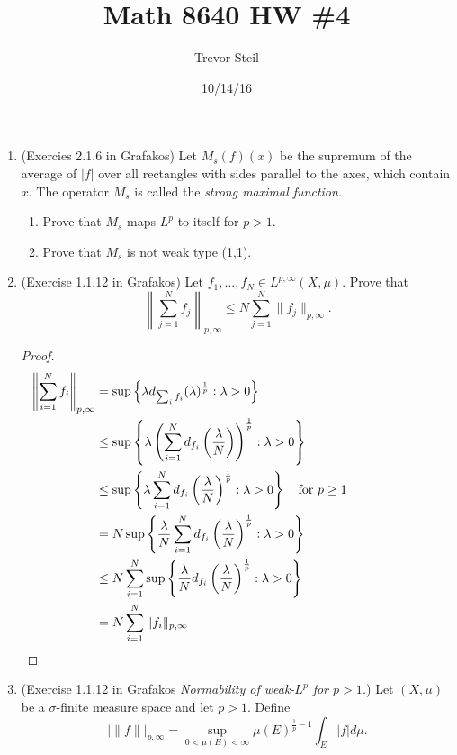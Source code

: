\documentclass[a4paper]{article}
\title{Math 8640 HW \#4}
\date{10/14/16}
\author{Trevor Steil}
\begin{document}
\maketitle

\begin{enumerate}
  \item (Exercies 2.1.6 in Grafakos) Let $M_s(f)(x)$ be the supremum of the average of $|f|$ over all rectangles with sides parallel to the axes,
    which contain $x$. The operator $M_s$ is called the \textit{strong maximal function}.

    \begin{enumerate}
      \item Prove that $M_s$ maps $L^p$ to itself for $p>1$.
      \item Prove that $M_s$ is not weak type (1,1).
    \end{enumerate}

  \item (Exercise 1.1.12 in Grafakos) Let $f_1, \dots, f_N \in L^{p,\infty}(X,\mu)$. Prove that
    \[ \left\| \sum_{j=1}^N f_j \right\|_{p,\infty} \leq N \sum_{j=1}^N \| f_j \|_{p,\infty} .\]

    \begin{proof}

      \begin{align*}
        \left\| \sum_{i=1}^N f_i \right\|_{p,\infty} &= \sup \left\{ \lambda d_{\sum_i f_i}(\lambda)^{\frac{1}{p}} : \lambda>0 \right\} \\
        &\leq \sup \left\{ \lambda \left( \sum_{i=1}^N d_{f_i} \left( \frac{\lambda}{N} \right) \right)^{\frac{1}{p}} : \lambda>0 \right\} \\
        &\leq \sup \left\{ \lambda \sum_{i=1}^N d_{f_i} \left( \frac{\lambda}{N} \right)^{\frac{1}{p}} : \lambda >0 \right\} \quad \parbox{4cm}{for $p \geq 1$} \\
        &= N \sup \left\{ \frac{\lambda}{N} \sum_{i=1}^N d_{f_i} \left( \frac{\lambda}{N} \right)^\frac{1}{p} : \lambda > 0 \right\} \\
        &\leq N \sum_{i=1}^N \sup \left\{ \frac{\lambda}{N} d_{f_i} \left( \frac{\lambda}{N} \right)^\frac{1}{p} : \lambda>0 \right\} \\
        &= N \sum_{i=1}^N \|f_i\|_{p,\infty}
      \end{align*}

    \end{proof}

  \item (Exercise 1.1.12 in Grafakos \textit{Normability of weak-$L^p$ for $p>1$.}) Let $(X,\mu)$ be a $\sigma$-finite measure space and let $p>1$.
    Define
    \[ | \| f \| |_{p,\infty} = \sup_{0 < \mu(E) < \infty} \mu(E)^{\frac{1}{p} - 1} \int_{E}^{}|f| d \mu .\]


\end{enumerate}
\end{document}
